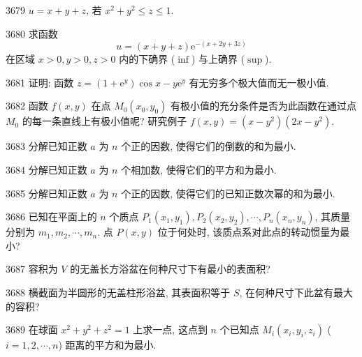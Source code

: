 \begin{prob}[S]{3679}
$u = x + y + z$, 若 $x^2 + y^2 \leqslant z \leqslant 1$.
\end{prob}

\begin{prob}[M]{3680}
求函数
\[
u = (x + y + z)\mathrm{e}^{-(x + 2y + 3z)}
\]
在区域 $x > 0, y > 0, z > 0$ 内的下确界 ($\inf$) 与上确界 ($\sup$).
\end{prob}

\begin{prob}[M]{3681}
证明: 函数 $z = (1 + \mathrm{e}^y)\cos x - y\mathrm{e}^y$ 有无穷多个极大值而无一极小值.
\end{prob}

\begin{prob}[M]{3682}
函数 $f(x, y)$ 在点 $M_0(x_0, y_0)$ 有极小值的充分条件是否为此函数在通过点 $M_0$ 的每一条直线上有极小值呢? 研究例子 $f(x, y) = (x - y^2)(2x - y^2)$.
\end{prob}

\begin{prob}[S]{3683}
分解已知正数 $a$ 为 $n$ 个正的因数, 使得它们的倒数的和为最小.
\end{prob}

\begin{prob}[S]{3684}
分解已知正数 $a$ 为 $n$ 个相加数, 使得它们的平方和为最小.
\end{prob}

\begin{prob}[S]{3685}
分解已知正数 $a$ 为 $n$ 个正的因数, 使得它们的已知正数次幂的和为最小.
\end{prob}

\begin{prob}[M]{3686}
已知在平面上的 $n$ 个质点 $P_1(x_1, y_1), P_2(x_2, y_2), \cdots, P_n(x_n, y_n)$, 其质量分别为 $m_1, m_2, \cdots, m_n$. 点 $P(x, y)$ 位于何处时, 该质点系对此点的转动惯量为最小?
\end{prob}

\begin{prob}[S]{3687}
容积为 $V$ 的无盖长方浴盆在何种尺寸下有最小的表面积?
\end{prob}

\begin{prob}[M]{3688}
横截面为半圆形的无盖柱形浴盆, 其表面积等于 $S$, 在何种尺寸下此盆有最大的容积?
\end{prob}

\begin{prob}[M]{3689}
在球面 $x^2 + y^2 + z^2 = 1$ 上求一点, 这点到 $n$ 个已知点 $M_i(x_i, y_i, z_i)$ ($i = 1, 2, \cdots, n$) 距离的平方和为最小.
\end{prob}

